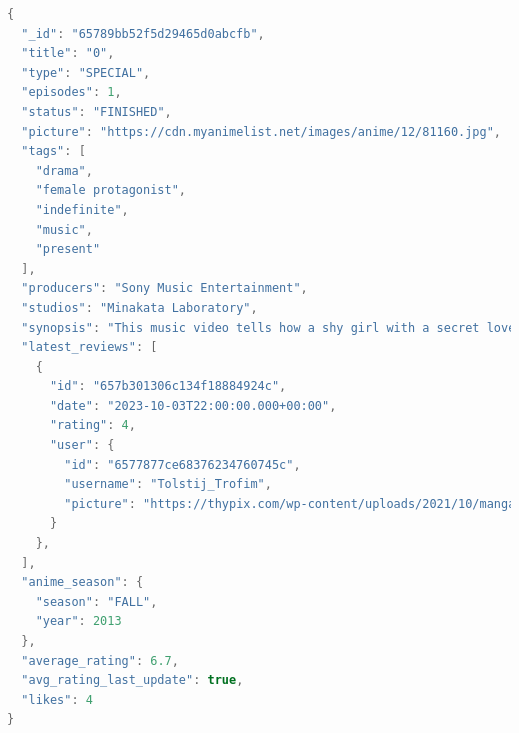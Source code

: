 \begin{mdframed}[backgroundcolor=yellow!20, innerleftmargin=10pt, innerrightmargin=10pt]
    \begin{lstlisting}[language=java]
{
  "_id": "65789bb52f5d29465d0abcfb",
  "title": "0",
  "type": "SPECIAL",
  "episodes": 1,
  "status": "FINISHED",
  "picture": "https://cdn.myanimelist.net/images/anime/12/81160.jpg",
  "tags": [
    "drama",
    "female protagonist",
    "indefinite",
    "music",
    "present"
  ],
  "producers": "Sony Music Entertainment",
  "studios": "Minakata Laboratory",
  "synopsis": "This music video tells how a shy girl with a secret love and curiosity...",
  "latest_reviews": [
    {
      "id": "657b301306c134f18884924c",
      "date": "2023-10-03T22:00:00.000+00:00",
      "rating": 4,
      "user": {
        "id": "6577877ce68376234760745c",
        "username": "Tolstij_Trofim",
        "picture": "https://thypix.com/wp-content/uploads/2021/10/manga-profile-picture-10..."
      }
    },
  ],
  "anime_season": {
    "season": "FALL",
    "year": 2013
  },
  "average_rating": 6.7,
  "avg_rating_last_update": true,
  "likes": 4
}
    \end{lstlisting}
\end{mdframed}

